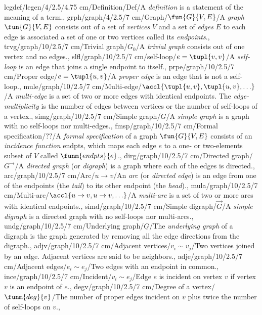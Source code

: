 legdef/legen/4/2.5/4.75 cm/Definition/Def/{A \emph{definition} is a statement of the meaning of a term.},
grph/graph/4/2.5/7 cm/Graph/{$\fun{G}{V,E}$}/{A \emph{graph} $\fun{G}{V,E}$ consists out of a set of \emph{vertices} $V$ and a set of \emph{edges} $E$ to each edge is associated a set of one or two vertices called its \emph{endpoints}.},
trvg/graph/10/2.5/7 cm/{Trivial graph}/$G_0$/{A \emph{trivial graph} consists out of one vertex and no edges.},
slfl/graph/10/2.5/7 cm/{self-loop}/$e=\tupl{v,v}$/{A \emph{self-loop} is an edge that joins a single endpoint to itself.},
prpe/graph/10/2.5/7 cm/{Proper edge}/$e=\tupl{u,v}$/{A \emph{proper edge} is an edge that is not a self-loop.},
mule/graph/10/2.5/7 cm/{Multi-edge}/$\accl{\tupl{u,v},\tupl{u,v},\ldots}$/{A \emph{multi-edge} is a set of two or more edges with identical endpoints. The \emph{edge-multiplicity} is the number of edges between vertices or the number of self-loops of a vertex.},
simg/graph/10/2.5/7 cm/{Simple graph}/$G$/{A \emph{simple graph} is a graph with no self-loops nor multi-edges.},
fmsp/graph/10/2.5/7 cm/{Formal specification}/$??$/{A \emph{formal specification} of a graph $\fun{G}{V,E}$ consists of an \emph{incidence function} $\mbox{endpts}$, which maps each edge $e$ to a one- or two-elements subset of $V$ called $\funm{endpts}{e}$.},
dirg/graph/10/2.5/7 cm/{Directed graph}/$G^{\rightarrow}$/{A \emph{directed graph} (or \emph{digraph}) is a graph where each of the edges is directed.},
arc/graph/10/2.5/7 cm/{Arc}/$u\rightarrow v$/{An \emph{arc} (or \emph{directed edge}) is an edge from one of the endpoints (the \emph{tail}) to its other endpoint (the \emph{head}).},
mula/graph/10/2.5/7 cm/{Multi-arc}/$\accl{u\rightarrow v,u\rightarrow v,\ldots}$/{A \emph{multi-arc} is a set of two or more arcs with identical endpoints.},
simd/graph/10/2.5/7 cm/{Simple digraph}/$\vec{G}$/{A \emph{simple digraph} is a directed graph with no self-loops nor multi-arcs.},
undg/graph/10/2.5/7 cm/{Underlying graph}/$\underline{G}$/{The \emph{underlying graph} of a digraph is the graph generated by removing all the edge directions from the digraph.},
adjv/graph/10/2.5/7 cm/{Adjacent vertices}/{$v_i\sim v_j$}/{Two vertices joined by an edge. Adjacent vertices are said to be neighbors.},
adje/graph/10/2.5/7 cm/{Adjacent edges}/{$e_i\sim e_j$}/{Two edges with an endpoint in common.},
ince/graph/10/2.5/7 cm/{Incident}/{$v_i\sim e_j$}/{Edge $e$ is incident on vertex $v$ if vertex $v$ is an endpoint of $e$.},
degv/graph/10/2.5/7 cm/{Degree of a vertex}/{$\funm{deg}{v}$}/{The number of proper edges incident on $v$ plus twice the number of self-loops on $v$.},
